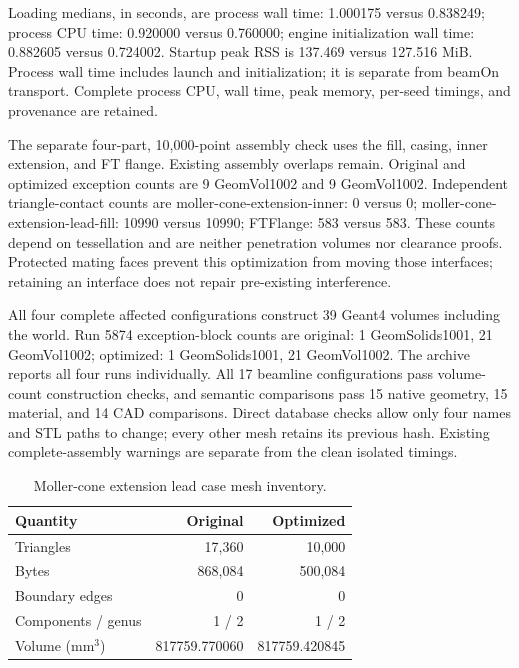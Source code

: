 Loading medians, in seconds, are process wall time: 1.000175 versus 0.838249; process CPU time: 0.920000
versus 0.760000; engine initialization wall time: 0.882605 versus 0.724002. Startup peak RSS is 137.469 versus
127.516 MiB. Process wall time includes launch and initialization; it is separate from beamOn transport.
Complete process CPU, wall time, peak memory, per-seed timings, and provenance are retained.

The separate four-part, 10,000-point assembly check uses the fill, casing, inner extension, and FT flange.
Existing assembly overlaps remain. Original and optimized exception counts are 9 GeomVol1002 and 9
GeomVol1002. Independent triangle-contact counts are moller-cone-extension-inner: 0 versus 0;
moller-cone-extension-lead-fill: 10990 versus 10990; FTFlange: 583 versus 583. These counts depend on
tessellation and are neither penetration volumes nor clearance proofs. Protected mating faces prevent this
optimization from moving those interfaces; retaining an interface does not repair pre-existing interference.

All four complete affected configurations construct 39 Geant4 volumes including the world. Run 5874
exception-block counts are original: 1 GeomSolids1001, 21 GeomVol1002; optimized: 1 GeomSolids1001, 21
GeomVol1002. The archive reports all four runs individually. All 17 beamline configurations pass volume-count
construction checks, and semantic comparisons pass 15 native geometry, 15 material, and 14 CAD comparisons.
Direct database checks allow only four names and STL paths to change; every other mesh retains its previous
hash. Existing complete-assembly warnings are separate from the clean isolated timings.

\begin{table}[htbp]
\centering
\caption{Moller-cone extension lead case mesh inventory.}
\label{tab:extension_case0}
\setlength{\tabcolsep}{5pt}
\begin{tabular}{lrr}
\toprule
Quantity & Original & Optimized \\
\midrule
Triangles & 17,360 & 10,000 \\
Bytes & 868,084 & 500,084 \\
Boundary edges & 0 & 0 \\
Components / genus & 1 / 2 & 1 / 2 \\
Volume (mm$^3$) & 817759.770060 & 817759.420845 \\
\bottomrule
\end{tabular}
\end{table}

